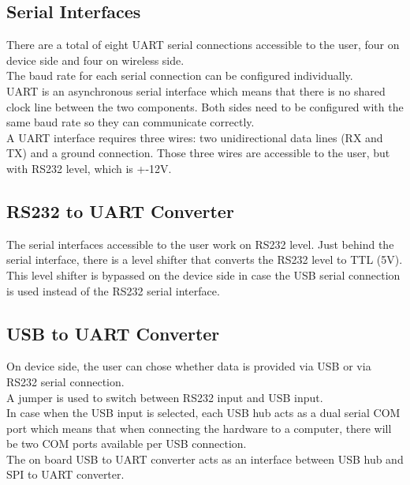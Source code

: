 \subsection{Serial Interfaces}
There are a total of eight UART serial connections accessible to the user, four on device side and four on wireless side.\\
The baud rate for each serial connection can be configured individually. \\
UART is an asynchronous serial interface which means that there is no shared clock line between the two components. Both sides need to be configured with the same baud rate so they can communicate correctly.\\
A UART interface requires three wires: two unidirectional data lines (RX and TX) and a ground connection. Those three wires are accessible to the user, but with RS232 level, which is +-12V.
%
\subsection{RS232 to UART Converter}
The serial interfaces accessible to the user work on RS232 level. Just behind the serial interface, there is a level shifter that converts the RS232 level to TTL (5V). \\
This level shifter is bypassed on the device side in case the USB serial connection is used instead of the RS232 serial interface.
%
\subsection{USB to UART Converter} \label{subsec:UsbToUartConverter}
On device side, the user can chose whether data is provided via USB or via RS232 serial connection.\\
A jumper is used to switch between RS232 input and USB input. \\
In case when the USB input is selected, each USB hub acts as a dual serial COM port which means that when connecting the hardware to a computer, there will be two COM ports available per USB connection. \\
The on board USB to UART converter acts as an interface between USB hub and SPI to UART converter.\\
%

